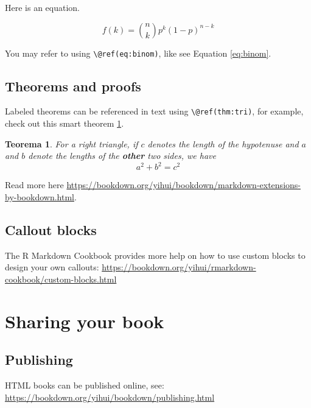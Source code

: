 \documentclass[
]{book}
\newtheorem{theorem}{Teorema}[chapter]
\theoremstyle{definition}
\theoremstyle{definition}
\theoremstyle{definition}
\theoremstyle{definition}
\theoremstyle{remark}
\begin{document}
Here is an equation.

\begin{equation} 
  f\left(k\right) = \binom{n}{k} p^k\left(1-p\right)^{n-k}
  \label{eq:binom}
\end{equation}

You may refer to using \texttt{\textbackslash{}@ref(eq:binom)}, like see Equation \eqref{eq:binom}.

\hypertarget{theorems-and-proofs}{%
\section{Theorems and proofs}\label{theorems-and-proofs}}

Labeled theorems can be referenced in text using \texttt{\textbackslash{}@ref(thm:tri)}, for example, check out this smart theorem \ref{thm:tri}.

\begin{theorem}
\protect\hypertarget{thm:tri}{}\label{thm:tri}For a right triangle, if \(c\) denotes the \emph{length} of the hypotenuse
and \(a\) and \(b\) denote the lengths of the \textbf{other} two sides, we have
\[a^2 + b^2 = c^2\]
\end{theorem}

Read more here \url{https://bookdown.org/yihui/bookdown/markdown-extensions-by-bookdown.html}.

\hypertarget{callout-blocks}{%
\section{Callout blocks}\label{callout-blocks}}

The R Markdown Cookbook provides more help on how to use custom blocks to design your own callouts: \url{https://bookdown.org/yihui/rmarkdown-cookbook/custom-blocks.html}

\hypertarget{sharing-your-book}{%
\chapter{Sharing your book}\label{sharing-your-book}}

\hypertarget{publishing}{%
\section{Publishing}\label{publishing}}

HTML books can be published online, see: \url{https://bookdown.org/yihui/bookdown/publishing.html}
\end{document}
